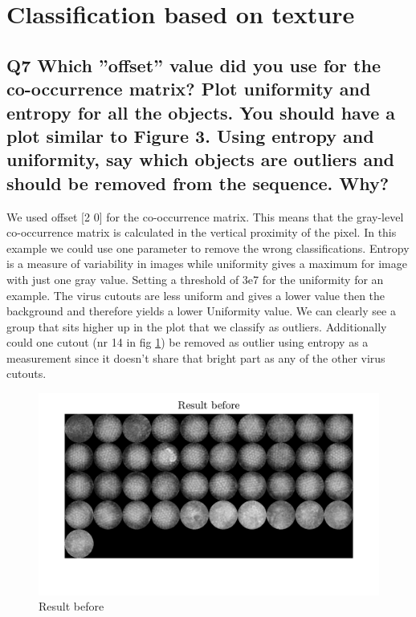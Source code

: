 \documentclass[oneside,a4paper]{article}
\begin{document}
\section{Classification based on texture}

\subsection*{Q7 Which ”offset” value did you use for the co-occurrence matrix? Plot uniformity and entropy for all the objects. You should have a plot similar to Figure 3. Using entropy and uniformity, say which objects are outliers and should be removed from the sequence. Why?}

\noindent We used offset [2 0] for the co-occurrence matrix. This means that the gray-level co-occurrence matrix is calculated in the vertical proximity of the pixel. In this example we could use one parameter to remove the wrong classifications. Entropy is a measure of variability in images while uniformity gives a maximum for image with just one gray value. Setting a threshold of 3e7 for the uniformity for an example. The virus cutouts are less uniform and gives a lower value then the background and therefore yields a lower Uniformity value. We can clearly see a group that sits higher up in the plot that we classify as outliers. Additionally could one cutout (nr 14 in fig \ref{fig:Q7bef}) be removed as outlier using entropy as a measurement since it doesn't share that bright part as any of the other virus cutouts. 



\begin{figure}[ht!]
\centering
\includegraphics[width=140mm]{figures/Q7_before.png}
\caption{Result before}
\label{fig:Q7bef}
\end{figure}
\end{document}
